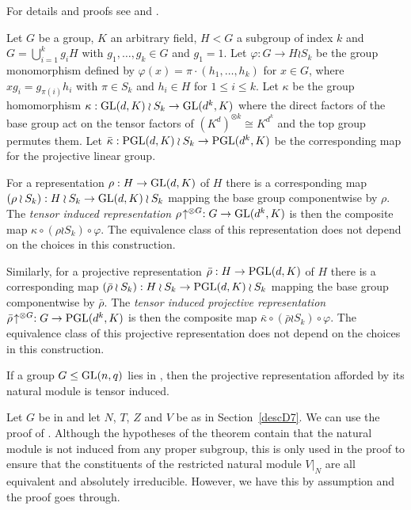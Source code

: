 \begin{DefProp}
\label{tensorinduction}
%
    For details and proofs see \cite[13A]{CRI} and \cite[Section~2]{kovacs}.

    Let $G$ be a group, $K$ an arbitrary field, $H<G$ a subgroup of
    index $k$ and $G=\bigcup_{i=1}^k g_i H$ with $g_1,\ldots,g_k \in
    G$ and $g_1=1$. Let $\varphi : G \to H \wr S_k$ be the group
    monomorphism defined by $\varphi(x) = \pi \cdot (h_1,\ldots,h_k)$
    for $x \in G$, where $xg_i = g_{\pi(i)}h_i$ with $\pi \in S_k$
    and $h_i \in H$ for $1 \le i \le k$.
    Let $\kappa$ be the group homomorphism $\kappa: \GL(d,K)
    \wr S_k \to \GL(d^k,K)$ where the direct factors of the base group
    act on the tensor factors of $(K^d)^{\otimes k} \cong K^{d^k}$ and
    the top group permutes them. Let $\bar\kappa : \PGL(d,K) \wr S_k
    \to \PGL(d^k,K)$ be the corresponding map for the projective linear
    group.

    For a representation $\rho: H \to \GL(d,K)$ of $H$
    there is a corresponding map $(\rho \wr S_k) : H \wr S_k \to
    \GL(d,K) \wr S_k$ mapping the base group componentwise by $\rho$. 
    The \emph{tensor induced representation}
    $\rho\!\uparrow^{\otimes G} : G \to \GL(d^k,K)$ is then the
    composite map $\kappa \circ (\rho \wr S_k) \circ \varphi$. The
    equivalence class of this representation does not depend on the
    choices in this construction.

    Similarly,
    for a projective representation $\bar\rho : H \to \PGL(d,K)$ of
    $H$ there is a corresponding map 
    $(\bar\rho \wr S_k) : H \wr S_k \to \PGL(d,K) \wr S_k$ 
    mapping the base group
    componentwise by $\bar\rho$.
    The \emph{tensor induced projective representation}
    $\bar\rho\!\uparrow^{\otimes G} : G \to \PGL(d^k,K)$ is then the
    composite map $\bar\kappa \circ (\bar\rho \wr S_k) \circ \varphi$.
    The equivalence class of this projective representation does not
    depend on the choices in this construction.
\end{DefProp}

\begin{Prop}
    \label{tensorindprop}
%
If a group $G \le \GL(n,q)$ lies in , then the projective
representation afforded by its natural module is tensor induced.
\end{Prop}
\proofbeg
Let $G$ be in  and let $N$, $T$, $Z$ and $V$ be as in
Section~\ref{descD7}.
We can use the proof of \cite[Tensor Induction Theorem]{kovacs}. 
Although the hypotheses of
the theorem contain that the natural module is not induced from any
proper subgroup, this is only used in the proof to ensure that the
constituents of the restricted natural module $V|_N$ are all
equivalent and absolutely irreducible. However, we have this by
assumption and the proof goes through.
\proofend

